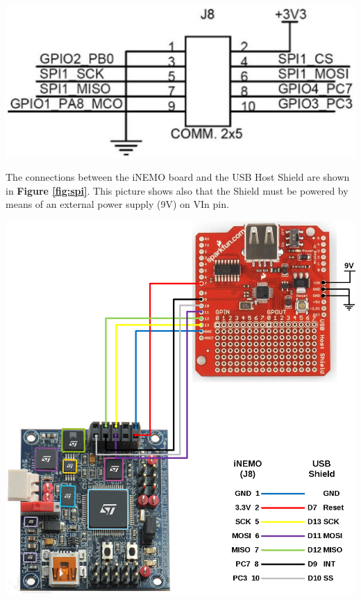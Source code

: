 \begin{center}
	\includegraphics[width=0.95\linewidth]{pics/j8.eps}
	\label{fig:j8}
\end{center}

The connections between the iNEMO board and the USB Host Shield are shown in {\bf Figure \ref{fig:spi}}. This picture shows also that the Shield must be powered by means of an external power supply (9V) on VIn pin.

\begin{center}
	\includegraphics[width=0.95\linewidth]{pics/SPI_wirings.eps}
	\label{fig:spi}
\end{center}

